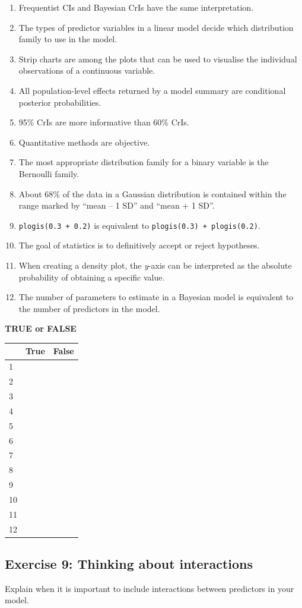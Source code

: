 \documentclass[
]{article}
\providecommand{\tightlist}{%
  \setlength{\itemsep}{0pt}\setlength{\parskip}{0pt}}
\begin{document}
\begin{enumerate}
\def\labelenumi{\arabic{enumi}.}
\tightlist
\item
  Frequentist CIs and Bayesian CrIs have the same interpretation.
\item
  The types of predictor variables in a linear model decide which
  distribution family to use in the model.
\item
  Strip charts are among the plots that can be used to visualise the
  individual observations of a continuous variable.
\item
  All population-level effects returned by a model summary are
  conditional posterior probabilities.
\item
  95\% CrIs are more informative than 60\% CrIs.
\item
  Quantitative methods are objective.
\item
  The most appropriate distribution family for a binary variable is the
  Bernoulli family.
\item
  About 68\% of the data in a Gaussian distribution is contained within
  the range marked by ``mean -- 1 SD'' and ``mean + 1 SD''.
\item
  \texttt{plogis(0.3\ +\ 0.2)} is equivalent to
  \texttt{plogis(0.3)\ +\ plogis(0.2)}.
\item
  The goal of statistics is to definitively accept or reject hypotheses.
\item
  When creating a density plot, the \emph{y}-axis can be interpreted as
  the absolute probability of obtaining a specific value.
\item
  The number of parameters to estimate in a Bayesian model is equivalent
  to the number of predictors in the model.
\end{enumerate}

\textbf{TRUE or FALSE}

\begin{longtable}[]{@{}lll@{}}
\toprule()
& True & False \\
\midrule()
\endhead
1 & & \\
2 & & \\
3 & & \\
4 & & \\
5 & & \\
6 & & \\
7 & & \\
8 & & \\
9 & & \\
10 & & \\
11 & & \\
12 & & \\
\bottomrule()
\end{longtable}

\hypertarget{exercise-9-thinking-about-interactions}{%
\subsection{Exercise 9: Thinking about
interactions}\label{exercise-9-thinking-about-interactions}}

Explain when it is important to include interactions between predictors
in your model.
\end{document}
